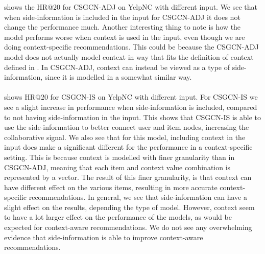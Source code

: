  shows the HR@20 for CSGCN-ADJ on YelpNC with different input. 
We see that when side-information is included in the input for CSGCN-ADJ it does not change the performance much.
Another interesting thing to note is how the model performs worse when context is used in the input, even though we are doing context-specific recommendations.
This could be because the CSGCN-ADJ model does not actually model context in way that fits the definition of context defined in .
In CSGCN-ADJ, context can instead be viewed as a type of side-information, since it is modelled in a somewhat similar way.
\\\\
 shows HR@20 for CSGCN-IS on YelpNC with different input.
For CSGCN-IS we see a slight increase in performance when side-information is included, compared to not having side-information in the input.
This shows that CSGCN-IS is able to use the side-information to better connect user and item nodes, increasing the collaborative signal.
We also see that for this model, including context in the input does make a significant different for the performance in a context-specific setting.
This is because context is modelled with finer granularity than in CSGCN-ADJ, meaning that each item and context value combination is represented by a vector.
The result of this finer granularity, is that context can have different effect on the various items, resulting in more accurate context-specific recommendations.
In general, we see that side-information can have a slight effect on the results, depending the type of model.
However, context seem to have a lot larger effect on the performance of the models, as would be expected for context-aware recommendations.
We do not see any overwhelming evidence that side-information is able to improve context-aware recommendations.
